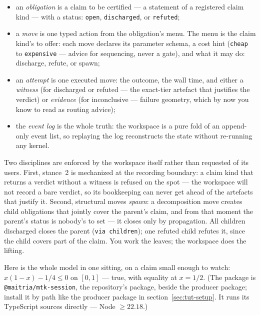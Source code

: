 \begin{itemize}
\item an \emph{obligation} is a claim to be certified --- a statement
  of a registered claim kind --- with a status: \texttt{open},
  \texttt{discharged}, or \texttt{refuted};
\item a \emph{move} is one typed action from the obligation's menu.
  The menu is the claim kind's to offer: each move declares its
  parameter schema, a cost hint (\texttt{cheap} to
  \texttt{expensive} --- advice for sequencing, never a gate), and
  what it may do: discharge, refute, or spawn;
\item an \emph{attempt} is one executed move: the outcome, the wall
  time, and either a \emph{witness} (for discharged or refuted ---
  the exact-tier artefact that justifies the verdict) or
  \emph{evidence} (for inconclusive --- failure geometry, which by
  now you know to read as routing advice);
\item the \emph{event log} is the whole truth: the workspace is a
  pure fold of an append-only event list, so replaying the log
  reconstructs the state without re-running any kernel.
\end{itemize}

\noindent Two disciplines are enforced by the workspace itself
rather than requested of its users. First, stance~2 is mechanized at
the recording boundary: a claim kind that returns a verdict without
a witness is refused on the spot --- the workspace will not record a
bare verdict, so its bookkeeping can never get ahead of the
artefacts that justify it. Second, structural moves \emph{spawn}: a
decomposition move creates child obligations that jointly cover the
parent's claim, and from that moment the parent's status is nobody's
to set --- it closes only by propagation. All children discharged
closes the parent (\texttt{via children}); one refuted child refutes
it, since the child covers part of the claim. You work the leaves;
the workspace does the lifting.

Here is the whole model in one sitting, on a claim small enough to
watch: $x(1-x) - 1/4 \le 0$ on $[0,1]$ --- true, with equality at
$x = 1/2$. (The package is \texttt{@maitria/mtk-session}, the
 repository's  package,
beside the producer package; install it by path like the producer
package in section~\ref{sec:tut-setup}. It runs its TypeScript
sources directly --- Node $\ge 22.18$.)



